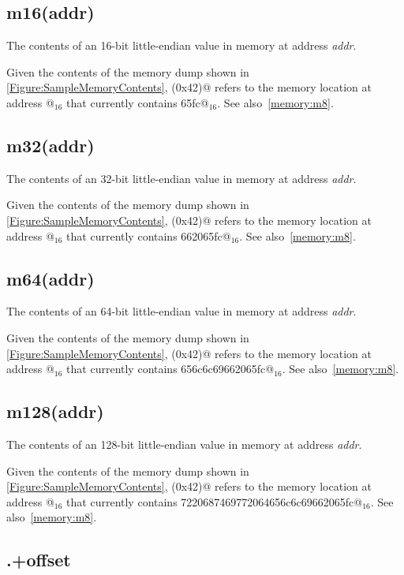 \subsection{m16(addr)}
\label{memory:m16}

The contents of an 16-bit little-endian value in memory at address {\em addr}.

Given the contents of the memory dump shown in
\autoref{Figure:SampleMemoryContents},
(0x42)@ refers to the memory location at address @$_{16}$
that currently contains \verb@65fc@$_{16}$. See also~\autoref{memory:m8}.

\subsection{m32(addr)}
\label{memory:m32}

The contents of an 32-bit little-endian value in memory at address {\em addr}.

Given the contents of the memory dump shown in
\autoref{Figure:SampleMemoryContents},
(0x42)@ refers to the memory location at address @$_{16}$
that currently contains \verb@662065fc@$_{16}$.
See also~\autoref{memory:m8}.

\subsection{m64(addr)}

The contents of an 64-bit little-endian value in memory at address {\em addr}.

Given the contents of the memory dump shown in
\autoref{Figure:SampleMemoryContents},
(0x42)@ refers to the memory location at address @$_{16}$
that currently contains \verb@656c6c69662065fc@$_{16}$.
See also~\autoref{memory:m8}.

\subsection{m128(addr)}

The contents of an 128-bit little-endian value in memory at
address {\em addr}.

Given the contents of the memory dump shown in
\autoref{Figure:SampleMemoryContents},
(0x42)@ refers to the memory location at address @$_{16}$
that currently contains \verb@7220687469772064656c6c69662065fc@$_{16}$.
See also~\autoref{memory:m8}.

\subsection{.+offset}

